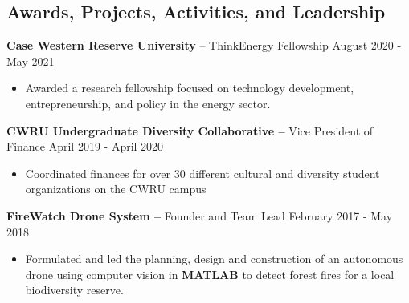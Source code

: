 \documentclass{res}
\begin{document}
\begin{resume}
\section{Awards, Projects, Activities, and Leadership} 
{\bf Case Western Reserve University} – ThinkEnergy Fellowship   \hfill    August 2020 - May 2021 
\begin{itemize} \itemsep -2pt
	\item Awarded a research fellowship focused on technology development, entrepreneurship, and policy in the energy sector.
\end{itemize}
{\bf CWRU Undergraduate Diversity Collaborative –} Vice President of Finance     \hfill    April 2019 - April 2020 
 \begin{itemize} \itemsep -2pt
 \item Coordinated finances for over 30 different cultural and diversity student organizations on the CWRU campus 
 \end{itemize}
{\bf FireWatch Drone System –} Founder and Team Lead  \hfill
February 2017 - May 2018               
                \begin{itemize} \itemsep -2pt
                 \item  Formulated and led the planning, design and construction of an autonomous drone using computer vision in \textbf{MATLAB} to detect forest fires for a local biodiversity reserve.
		 \end{itemize}
		

\end{resume} 
\end{document}
